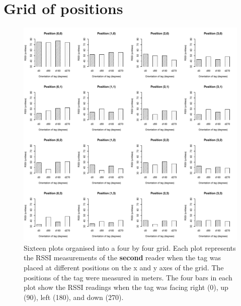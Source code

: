 

\newpage
\section{Grid of positions}
\label{sec:rssigridap}

\begin{figure}[H]
	\begin{center}
		\includegraphics[width=1\textwidth]{figures/rssi_distance_grid_r2}
		\caption{Sixteen plots organised into a four by four grid. Each plot represents the RSSI measurements of the \textbf{second} reader when the tag was placed at different positions on the x and y axes of the grid. The positions of the tag were  measured in meters. The four bars in each plot show the RSSI readings when the tag was facing right (0\textdegree), up (90\textdegree), left (180\textdegree), and down (270\textdegree).}
	\end{center}
\end{figure}

